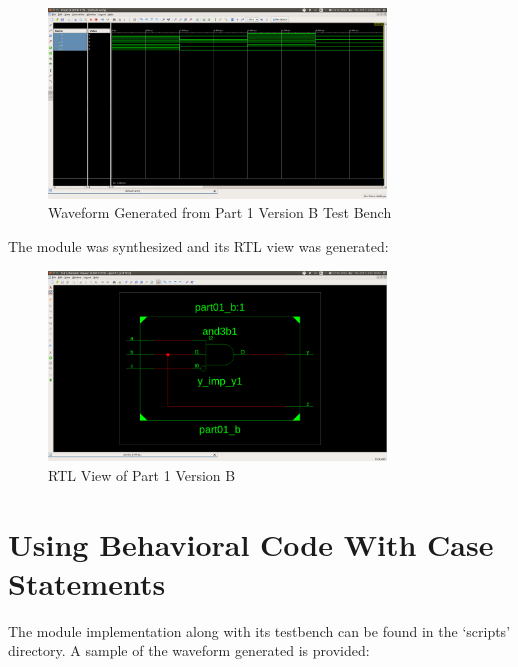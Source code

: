 \documentclass[paper=usletter, fontsize=12pt]{article}
\begin{document}
    \begin{figure}[ht]
        \begin{center}
            \includegraphics[width=0.8\textwidth]{version_b_wav.png}
            \caption{Waveform Generated from Part 1 Version B Test Bench} \label{fig:b_wav}
        \end{center}
    \end{figure}

    The module was synthesized and its RTL view was generated:
    \begin{figure}[ht]
        \begin{center}
            \includegraphics[width=0.8\textwidth]{version_b.png}
            \caption{RTL View of Part 1 Version B} \label{fig:b_rtl}
        \end{center}
    \end{figure}


    \section{Using Behavioral Code With Case Statements}
    The module implementation along with its testbench can be found in the `scripts' directory. A sample of the waveform generated is provided:
\end{document}

